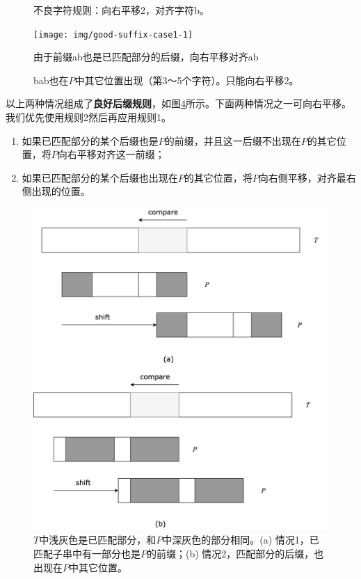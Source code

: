 \documentclass[b5paper]{ctexart}
\begin{document}
\begin{figure}[htbp]
 \centering
 \caption{不良字符规则：向右平移2，对齐字符b。}
 \label{fig:bad-char-2}
\end{figure}

\begin{figure}[htbp]
 \centering
 \texttt{[image: img/good-suffix-case1-1]}
 \caption{由于前缀ab也是已匹配部分的后缀，向右平移对齐ab}
 \label{fig:good-suffix-case1-1}
\end{figure}

\begin{figure}[htbp]
 \centering
 \caption{bab也在$P$中其它位置出现（第3～5个字符）。只能向右平移2。}
 \label{fig:good-suffix-case2-1}
\end{figure}

以上两种情况组成了\textbf{良好后缀规则}，如图\ref{fig:good-suffix-cases}所示。下面两种情况之一可向右平移。我们优先使用规则2然后再应用规则1。

\begin{enumerate}
\item 如果已匹配部分的某个后缀也是$P$的前缀，并且这一后缀不出现在$P$的其它位置，将$P$向右平移对齐这一前缀；
\item 如果已匹配部分的某个后缀也出现在$P$的其它位置，将$P$向右侧平移，对齐最右侧出现的位置。
\end{enumerate}

\begin{figure}[htbp]
 \centering
 \includegraphics[scale=0.5]{img/BM-good-suffix-rule}
 \caption{$T$中浅灰色是已匹配部分，和$P$中深灰色的部分相同。(a) 情况1，已匹配子串中有一部分也是$P$的前缀；(b) 情况2，匹配部分的后缀，也出现在$P$中其它位置。}
 \label{fig:good-suffix-cases}
\end{figure}
\end{document}
